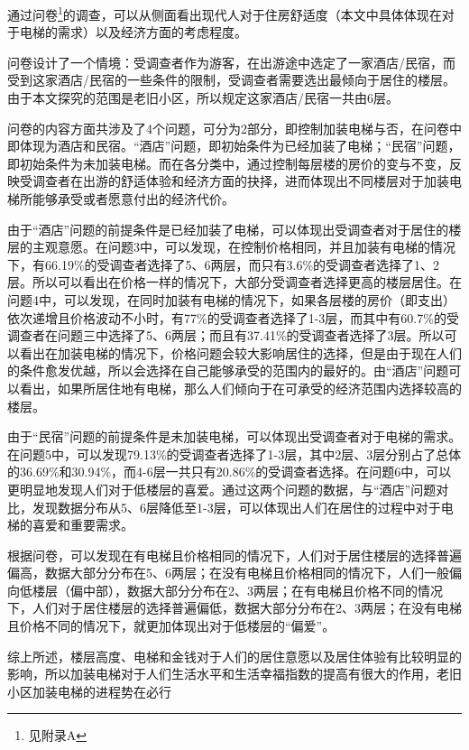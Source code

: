 \documentclass[lang=cn,a4paper]{elegantpaper}
\begin{document}
    通过问卷\footnote{见附录A}的调查，可以从侧面看出现代人对于住房舒适度（本文中具体体现在对于电梯的需求）以及经济方面的考虑程度。

    问卷设计了一个情境：受调查者作为游客，在出游途中选定了一家酒店/民宿，而受到这家酒店/民宿的一些条件的限制，受调查者需要选出最倾向于居住的楼层。由于本文探究的范围是老旧小区，所以规定这家酒店/民宿一共由6层。

    问卷的内容方面共涉及了4个问题，可分为2部分，即控制加装电梯与否，在问卷中即体现为酒店和民宿。“酒店”问题，即初始条件为已经加装了电梯；“民宿”问题，即初始条件为未加装电梯。而在各分类中，通过控制每层楼的房价的变与不变，反映受调查者在出游的舒适体验和经济方面的抉择，进而体现出不同楼层对于加装电梯所能够承受或者愿意付出的经济代价。
    
    由于“酒店”问题的前提条件是已经加装了电梯，可以体现出受调查者对于居住的楼层的主观意愿。在问题3中，可以发现，在控制价格相同，并且加装有电梯的情况下，有66.19\%的受调查者选择了5、6两层，而只有3.6\%的受调查者选择了1、2层。所以可以看出在价格一样的情况下，大部分受调查者选择更高的楼层居住。在问题4中，可以发现，在同时加装有电梯的情况下，如果各层楼的房价（即支出）依次递增且价格波动不小时，有77\%的受调查者选择了1-3层，而其中有60.7\%的受调查者在问题三中选择了5、6两层；而且有37.41\%的受调查者选择了3层。所以可以看出在加装电梯的情况下，价格问题会较大影响居住的选择，但是由于现在人们的条件愈发优越，所以会选择在自己能够承受的范围内的最好的。由“酒店”问题可以看出，如果所居住地有电梯，那么人们倾向于在可承受的经济范围内选择较高的楼层。

    由于“民宿”问题的前提条件是未加装电梯，可以体现出受调查者对于电梯的需求。在问题5中，可以发现79.13\%的受调查者选择了1-3层，其中2层、3层分别占了总体的36.69\%和30.94\%，而4-6层一共只有20.86\%的受调查者选择。在问题6中，可以更明显地发现人们对于低楼层的喜爱。通过这两个问题的数据，与“酒店”问题对比，发现数据分布从5、6层降低至1-3层，可以体现出人们在居住的过程中对于电梯的喜爱和重要需求。

    根据问卷，可以发现在有电梯且价格相同的情况下，人们对于居住楼层的选择普遍偏高，数据大部分分布在5、6两层；在没有电梯且价格相同的情况下，人们一般偏向低楼层（偏中部），数据大部分分布在2、3两层；在有电梯且价格不同的情况下，人们对于居住楼层的选择普遍偏低，数据大部分分布在2、3两层；在没有电梯且价格不同的情况下，就更加体现出对于低楼层的“偏爱”。

    综上所述，楼层高度、电梯和金钱对于人们的居住意愿以及居住体验有比较明显的影响，所以加装电梯对于人们生活水平和生活幸福指数的提高有很大的作用，老旧小区加装电梯的进程势在必行
\end{document}
